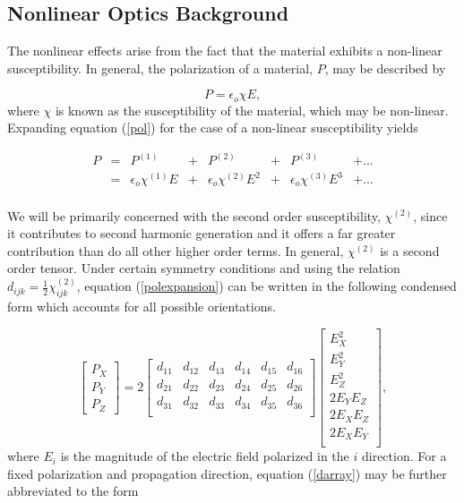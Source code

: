 \subsection{Nonlinear Optics Background}
\label{NLO}%

The nonlinear effects arise from the fact that the material
exhibits a non-linear susceptibility.  In general, the
polarization of a material, $P$, may be described by

\begin{equation}\label{pol}
P=\epsilon_o \chi E,
\end{equation} where $\chi$ is known as the susceptibility of the material, which
may be non-linear.  Expanding equation (\ref{pol}) for the case of
a non-linear susceptibility yields

\begin{equation}\label{polexpansion}
\begin{array}{cccccccc}
P&=&P^{(1)}&+&P^{(2)}&+&P^{(3)}&+ ...\\
&=&\epsilon_o\chi^{(1)}E&+& \epsilon_o\chi^{(2)}E^2&+& \epsilon_o\chi^{(3)}E^3&+ ... \\
\end{array}
\end{equation}

We will be primarily concerned with the second order
susceptibility, $\chi^{(2)}$, since it contributes to second
harmonic generation and it offers a far greater contribution than
do all other higher order terms.  In general, $\chi^{(2)}$ is a
second order tensor.  Under certain symmetry conditions and using
the relation $d_{ijk}=\frac{1}{2}\chi^{(2)}_{ijk}$, equation
(\ref{polexpansion}) can be written in the following condensed
form which accounts for all possible orientations.~\cite{RWBoyd}


\begin{equation}\label{darray}
\left[ \begin{array}{c} P_X \\
P_Y \\
P_Z \end{array} \right]= 2 \left[ \begin{array}{cccccc}
d_{11} & d_{12} & d_{13} & d_{14} & d_{15} & d_{16} \\
d_{21} & d_{22} & d_{23} & d_{24} & d_{25} & d_{26} \\
d_{31} & d_{32} & d_{33} & d_{34} & d_{35} & d_{36} \\
\end{array}\right]
\left[ \begin{array}{c} E_X^2 \\
E_Y^2 \\
E_Z^2 \\
2 E_Y E_Z \\
2 E_X E_Z \\
2 E_X E_Y \\
\end{array} \right],
\end{equation} where $E_i$ is the magnitude of the electric field polarized in
the $i$ direction.  For a fixed polarization and propagation
direction, equation (\ref{darray}) may be further abbreviated to
the form

